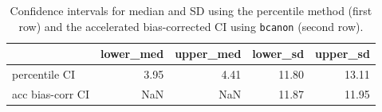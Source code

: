 \begin{table}[ht]
\centering
\begin{tabular}{lrrrr}
  \hline
 & lower\_med & upper\_med & lower\_sd & upper\_sd \\ 
  \hline
percentile CI & 3.95 & 4.41 & 11.80 & 13.11 \\ 
acc bias-corr CI & NaN & NaN & 11.87 & 11.95 \\ 
   \hline
\end{tabular}
\caption{Confidence intervals for median and SD using the percentile method (first row) and the accelerated bias-corrected CI using \texttt{bcanon} (second row).}
\label{3tabledata}
\end{table}

